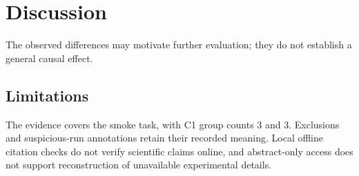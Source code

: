 \section{Discussion}
The observed differences may motivate further evaluation; they do not establish a general causal effect.
\subsection{Limitations}
The evidence covers the smoke task, with C1 group counts 3 and 3. Exclusions and suspicious-run annotations retain their recorded meaning. Local offline citation checks do not verify scientific claims online, and abstract-only access does not support reconstruction of unavailable experimental details.
